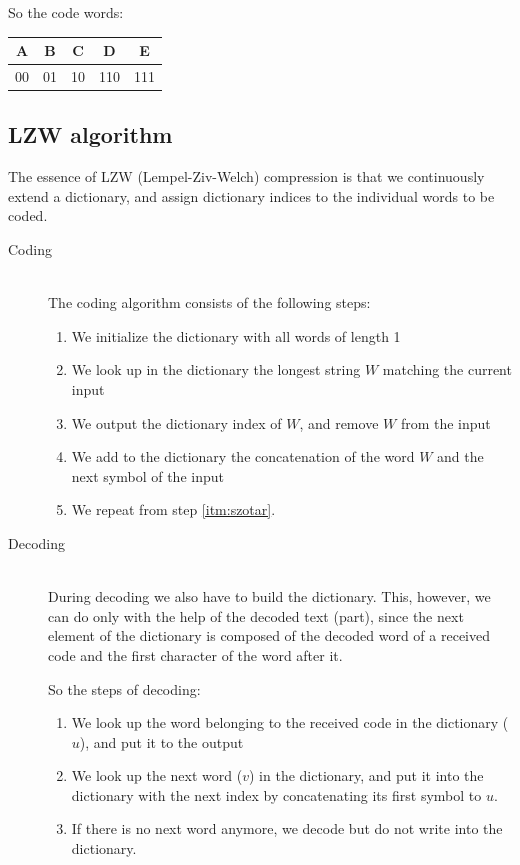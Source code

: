 \documentclass[margin=0px]{article}
\begin{document}
So the code words:

\begin{tabular}{|c|c|c|c|c|}
    \hline A  & B  & C  & D   & E   \\
    \hline 00 & 01 & 10 & 110 & 111 \\
    \hline
\end{tabular}
\subsection{LZW algorithm}
The essence of LZW (Lempel-Ziv-Welch) compression is that we continuously extend a dictionary, and assign dictionary indices to the individual words to be coded.
\begin{description}
    \item[Coding] \hfill \\
        The coding algorithm consists of the following steps:
        \begin{enumerate}
            \item We initialize the dictionary with all words of length 1
            \item \label{itm:szotar} We look up in the dictionary the longest string $W$ matching the current input
            \item We output the dictionary index of $W$, and remove $W$ from the input
            \item We add to the dictionary the concatenation of the word $W$ and the next symbol of the input
            \item We repeat from step \ref{itm:szotar}.
        \end{enumerate}
    \item[Decoding] \hfill \\
        During decoding we also have to build the dictionary. This, however, we can do only with the help of the decoded text (part), since the next element of the dictionary is composed of the decoded word of a received code and the first character of the word after it.

        So the steps of decoding:
        \begin{enumerate}
            \item We look up the word belonging to the received code in the dictionary ($u$), and put it to the output
            \item We look up the next word ($v$) in the dictionary, and put it into the dictionary with the next index by concatenating its first symbol to $u$.
            \item If there is no next word anymore, we decode but do not write into the dictionary.
        \end{enumerate}


\end{description}
\end{document}
